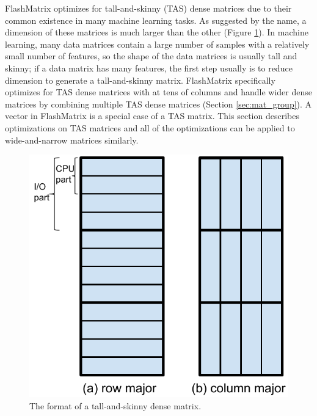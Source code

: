 FlashMatrix optimizes for tall-and-skinny (TAS) dense matrices due to their
common existence in many machine learning tasks. As suggested by the name,
a dimension of these matrices is much larger than the other (Figure \ref{fig:tas_mat}).
In machine learning, many data matrices contain a large number of samples with
a relatively small number of features, so the shape of the data matrices is
usually tall and skinny; if a data matrix has many features, the first step
usually is to reduce dimension to generate a tall-and-skinny matrix. FlashMatrix
specifically optimizes for TAS dense matrices with at tens of columns
and handle wider dense matrices by combining multiple TAS dense matrices
(Section \ref{sec:mat_group}). A vector in FlashMatrix is a special case of a TAS
matrix. This section describes optimizations on TAS matrices and all of
the optimizations can be applied to wide-and-narrow matrices similarly.

\begin{figure}
	\centering
	\includegraphics[scale=0.5]{./dense_matrix.pdf}
	\caption{The format of a tall-and-skinny dense matrix.}
	\label{fig:tas_mat}
\end{figure}

